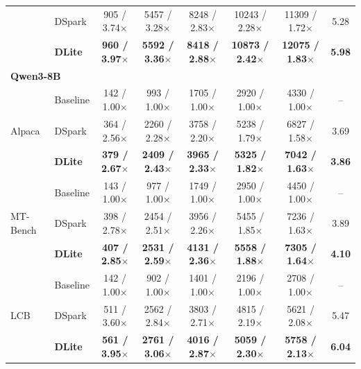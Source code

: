 \begin{table}[t]
{\begin{tabular}{llccccc|c}
& DSpark & 905 / 3.74$\times$ & 5457 / 3.28$\times$ & 8248 / 2.83$\times$ & 10243 / 2.28$\times$ & 11309 / 1.72$\times$ & 5.28 \\

& \textbf{DLite} & \textbf{960 / 3.97$\times$} & \textbf{5592 / 3.36$\times$} & \textbf{8418 / 2.88$\times$} & \textbf{10873 / 2.42$\times$} & \textbf{12075 / 1.83$\times$} & \textbf{5.98} \\

\midrule

\multicolumn{8}{l}{\textbf{Qwen3-8B}} \\
\midrule

\multirow{3}{*}{Alpaca}
& Baseline
& 142 / 1.00$\times$
& 993 / 1.00$\times$
& 1705 / 1.00$\times$
& 2920 / 1.00$\times$
& 4330 / 1.00$\times$
& -- \\

& DSpark
& 364 / 2.56$\times$
& 2260 / 2.28$\times$
& 3758 / 2.20$\times$
& 5238 / 1.79$\times$
& 6827 / 1.58$\times$
& 3.69 \\

& \textbf{DLite}
& \textbf{379 / 2.67$\times$}
& \textbf{2409 / 2.43$\times$}
& \textbf{3965 / 2.33$\times$}
& \textbf{5325 / 1.82$\times$}
& \textbf{7042 / 1.63$\times$}
& \textbf{3.86} \\

\midrule

\multirow{3}{*}{MT-Bench}
& Baseline
& 143 / 1.00$\times$
& 977 / 1.00$\times$
& 1749 / 1.00$\times$
& 2950 / 1.00$\times$
& 4450 / 1.00$\times$
& -- \\

& DSpark
& 398 / 2.78$\times$
& 2454 / 2.51$\times$
& 3956 / 2.26$\times$
& 5455 / 1.85$\times$
& 7236 / 1.63$\times$
& 3.89 \\

& \textbf{DLite}
& \textbf{407 / 2.85$\times$}
& \textbf{2531 / 2.59$\times$}
& \textbf{4131 / 2.36$\times$}
& \textbf{5558 / 1.88$\times$}
& \textbf{7305 / 1.64$\times$}
& \textbf{4.10} \\

\midrule

\multirow{3}{*}{LCB}
& Baseline
& 142 / 1.00$\times$
& 902 / 1.00$\times$
& 1401 / 1.00$\times$
& 2196 / 1.00$\times$
& 2708 / 1.00$\times$
& -- \\

& DSpark
& 511 / 3.60$\times$
& 2562 / 2.84$\times$
& 3803 / 2.71$\times$
& 4815 / 2.19$\times$
& 5621 / 2.08$\times$
& 5.47 \\

& \textbf{DLite}
& \textbf{561 / 3.95$\times$}
& \textbf{2761 / 3.06$\times$}
& \textbf{4016 / 2.87$\times$}
& \textbf{5059 / 2.30$\times$}
& \textbf{5758 / 2.13$\times$}
& \textbf{6.04} \\

\bottomrule
\end{tabular}
}
\end{table}



